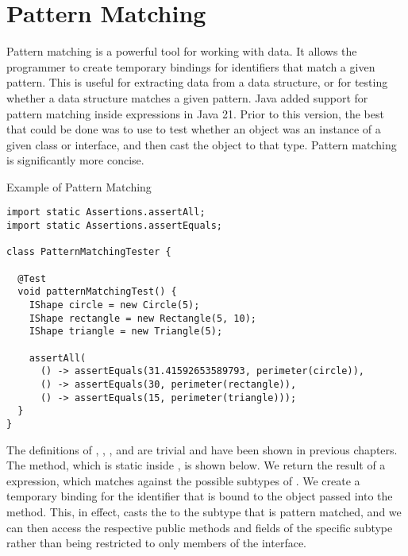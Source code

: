 \section{Pattern Matching}

Pattern matching is a powerful tool for working with data. It allows the programmer to create temporary bindings for identifiers that match a given pattern. This is useful for extracting data from a data structure, or for testing whether a data structure matches a given pattern. Java added support for pattern matching inside  expressions in Java 21. Prior to this version, the best that could be done was to use  to test whether an object was an instance of a given class or interface, and then cast the object to that type. Pattern matching is significantly more concise.


\begin{cl}[]{Example of Pattern Matching}
\begin{lstlisting}[language=MyJava]
import static Assertions.assertAll;
import static Assertions.assertEquals;

class PatternMatchingTester {

  @Test
  void patternMatchingTest() {
    IShape circle = new Circle(5);
    IShape rectangle = new Rectangle(5, 10);
    IShape triangle = new Triangle(5);

    assertAll(
      () -> assertEquals(31.41592653589793, perimeter(circle)),
      () -> assertEquals(30, perimeter(rectangle)),
      () -> assertEquals(15, perimeter(triangle)));
  }
}
\end{lstlisting}
\end{cl}

The definitions of , , , and  are trivial and have been shown in previous chapters. The  method, which is static inside , is shown below. We return the result of a  expression, which matches against the possible subtypes of . We create a temporary binding for the identifier  that is bound to the  object passed into the method. This, in effect, casts the  to the subtype that is pattern matched, and we can then access the respective public methods and fields of the specific subtype rather than being restricted to only members of the  interface.

